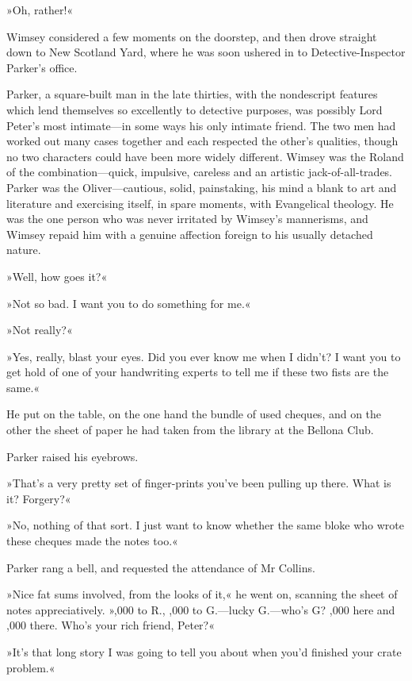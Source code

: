 »Oh, rather!«

Wimsey considered a few moments on the doorstep, and then drove straight down to New Scotland Yard, where he was soon ushered in to Detective-Inspector Parker's office.

Parker, a square-built man in the late thirties, with the nondescript features which lend themselves so excellently to detective purposes, was possibly Lord Peter's most intimate—in some ways his only intimate friend. The two men had worked out many cases together and each respected the other's qualities, though no two characters could have been more widely different. Wimsey was the Roland of the combination—quick, impulsive, careless and an artistic jack-of-all-trades. Parker was the Oliver—cautious, solid, painstaking, his mind a blank to art and literature and exercising itself, in spare moments, with Evangelical theology. He was the one person who was never irritated by Wimsey's mannerisms, and Wimsey repaid him with a genuine affection foreign to his usually detached nature.

»Well, how goes it?«

»Not so bad. I want you to do something for me.«

»Not really?«

»Yes, really, blast your eyes. Did you ever know me when I didn't? I want you to get hold of one of your handwriting experts to tell me if these two fists are the same.«

He put on the table, on the one hand the bundle of used cheques, and on the other the sheet of paper he had taken from the library at the Bellona Club.

Parker raised his eyebrows.

»That's a very pretty set of finger-prints you've been pulling up there. What is it? Forgery?«

»No, nothing of that sort. I just want to know whether the same bloke who wrote these cheques made the notes too.«

Parker rang a bell, and requested the attendance of Mr Collins.

»Nice fat sums involved, from the looks of it,« he went on, scanning the sheet of notes appreciatively. »,000 to R., ,000 to G.—lucky G.—who's G? ,000 here and ,000 there. Who's your rich friend, Peter?«

»It's that long story I was going to tell you about when you'd finished your crate problem.«

